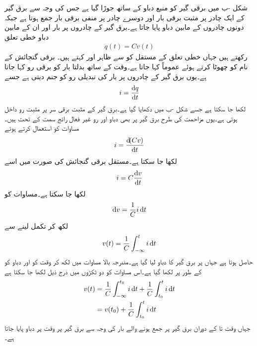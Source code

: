 شکل -ب میں برقی گیر کو  منبع دباو کے ساتھ جوڑا گیا ہے  جس کی وجہ سے برق گیر کے ایک چادر پر مثبت برقی بار  اور دوسرے چادر پر منفی برقی بار  جمع ہوتا ہے جبکہ دونوں چادروں کے مابین دباو  پایا جاتا ہے۔برق گیر کے چادروں پر بار اور ان کے مابین دباو خطی تعلق
\begin{align}\label{مساوات_امالہ_بار_دباو_تعلق}
q(t)=C v(t)
\end{align}
رکھتے ہیں جہاں خطی تعلق کے مستقل کو  سے ظاہر اور   کہتے ہیں۔ برقی گنجائش کے نام کو چھوٹا کرتے ہوئے عموماً  کہا جاتا ہے۔وقت کے ساتھ بدلتا بار کو برقی رو کہا جاتا ہے۔یوں برق گیر کے چادروں پر بار کی تبدیلی رو کو جنم دیتی ہے جسے
\begin{align}
i=\frac{\dif q}{\dif t}
\end{align}
لکھا جا سکتا ہے جسے شکل -ب میں دکھایا گیا ہے۔برق گیر کے مثبت برقی سر پر مثبت رو داخل ہوتی ہے۔یوں مزاحمت کی طرح  برق گیر پر بھی دباو اور رو غیر فعال رائج سمت کے تحت ہیں۔ مساوات  کو استعمال کرتے ہوئے 
\begin{align}
i=\frac{\dif (C v)}{\dif t}
\end{align}
لکھا جا سکتا ہے۔مستقل برقی گنجائش کی صورت میں اسے
\begin{align}\label{مساوات_امالہ_بار_دباو_تعلق_ب}
i=C\frac{\dif v}{\dif t}
\end{align}
لکھا جا سکتا ہے۔مساوات  کو
\begin{align*}
\dif v = \frac{1}{C} i \dif t
\end{align*}
لکھ کر تکمل لینے سے
\begin{align}\label{مساوات_امالہ_بار_دباو_تعلق_پ}
v(t)=\frac{1}{C} \int_{-\infty}^{t} i \dif t
\end{align}
حاصل ہوتا ہے جہاں  پر برق گیر کا دباو  لیا گیا ہے۔مندرجہ بالا مساوات میں  لکھ کر وقت کو  اور دباو کو  کے طور پر لکھا گیا ہے۔اس مساوات کو دو ٹکڑوں میں درج ذیل لکھا جا سکتا ہے
\begin{gather}
\begin{aligned}\label{مساوات_امالہ_ابتدائی_دباو_الف}
v(t)&=\frac{1}{C} \int_{-\infty}^{t_0} i \dif t+\frac{1}{C} \int_{t_0}^{t} i \dif t\\
&=v(t_0)+\frac{1}{C} \int_{t_0}^{t} i \dif t
\end{aligned}
\end{gather}
جہاں وقت  تا  کے دوران برق گیر پر جمع ہونے والے بار کی وجہ سے  برق گیر پر وقت  پر دباو  پایا جاتا ہے۔ 


